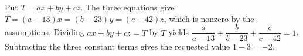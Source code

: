 Put $T=ax+by+cz$. The three equations give $T=(a-13)x=(b-23)y=(c-42)z$, which is nonzero by the assumptions. Dividing $ax+by+cz=T$ by $T$ yields $\dfrac{a}{a-13}+\dfrac{b}{b-23}+\dfrac{c}{c-42}=1$. Subtracting the three constant terms gives the requested value $1-3=\boxed{-2}$.
